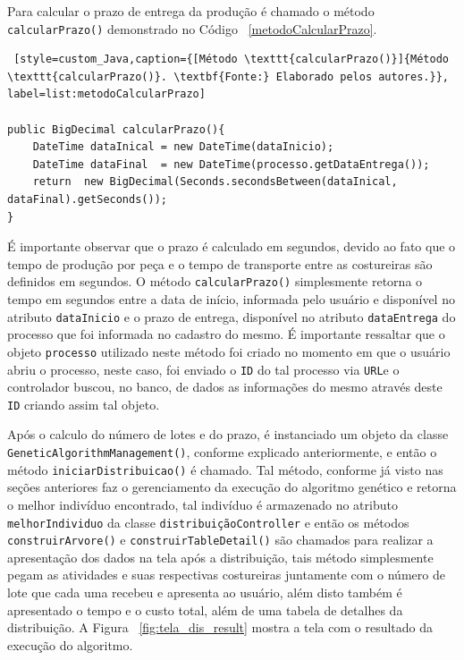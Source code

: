 \par Para calcular o prazo de entrega da produção é chamado o método \texttt{calcularPrazo()} demonstrado no 
Código ~\ref{metodoCalcularPrazo}.

\begin{lstlisting} [style=custom_Java,caption={[Método \texttt{calcularPrazo()}]{Método \texttt{calcularPrazo()}. \textbf{Fonte:} Elaborado pelos autores.}}, label=list:metodoCalcularPrazo] 

public BigDecimal calcularPrazo(){
	DateTime dataInical = new DateTime(dataInicio);
	DateTime dataFinal  = new DateTime(processo.getDataEntrega());
	return  new BigDecimal(Seconds.secondsBetween(dataInical, dataFinal).getSeconds());
}

\end{lstlisting}

\par É importante observar que o prazo é calculado em segundos, devido ao fato que o tempo de produção por peça e o tempo 
de transporte entre as costureiras são definidos em segundos. O método \texttt{calcularPrazo()} simplesmente retorna o tempo 
em segundos entre a data de início, informada pelo usuário e disponível no atributo \texttt{dataInicio} e o prazo de entrega, 
disponível no atributo \texttt{dataEntrega} do processo que foi informada no cadastro do mesmo. É importante ressaltar que
o objeto \texttt{processo} utilizado neste método foi criado no momento em que o usuário abriu o processo, neste caso, foi enviado
o \texttt{ID} do tal processo via \texttt{URL}e o controlador buscou, no banco, de dados as informações do mesmo através deste \texttt{ID}
criando assim tal objeto.

\par Após o calculo do número de lotes e do prazo, é instanciado um objeto da classe \texttt{GeneticAlgorithmManagement()}, conforme
explicado anteriormente, e então o método \texttt{iniciarDistribuicao()} é chamado. Tal método, conforme já visto nas seções anteriores
faz o gerenciamento da execução do algoritmo genético e retorna o melhor indivíduo encontrado, tal indivíduo é armazenado no 
atributo \texttt{melhorIndividuo} da classe \texttt{distribuiçãoController} e então os métodos \texttt{construirArvore()} e
\texttt{construirTableDetail()} são chamados para realizar a apresentação dos dados na tela após a distribuição, tais método
simplesmente pegam as atividades e suas respectivas costureiras juntamente com o número de lote que cada uma recebeu e 
apresenta ao usuário, além disto também é apresentado o tempo e o custo total, além de uma tabela de detalhes da distribuição.
A Figura ~\ref{fig:tela_dis_result} mostra a tela com o resultado da execução do algoritmo.

